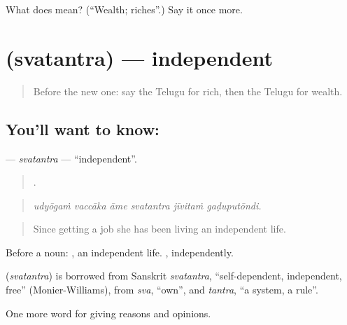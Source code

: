 \begin{tcolorbox}[breakable,colback=teal!4,colframe=teal!35!black,title={Before you move on}]
What does  mean? (\textquotedblleft{}Wealth; riches\textquotedblright{}.) Say it once more.
\end{tcolorbox}
\section[\texorpdfstring{\te{స్వతంత్ర} (svatantra)}{స్వతంత్ర (svatantra)}]{ (svatantra) — independent}

\label{lesson:TE-C404-svatantra}



\begin{quote}
Before the new one: say the Telugu for rich, then the Telugu for wealth.
\end{quote}

\subsection*{You'll want to know: }
\textbf{} — \emph{svatantra} — \textquotedblleft{}independent\textquotedblright{}.

\begin{quote}
     .
\end{quote}

\begin{quote}
\emph{udyōgaṁ vaccāka āme svatantra jīvitaṁ gaḍuputōndi.}
\end{quote}

\begin{quote}
Since getting a job she has been living an independent life.
\end{quote}

Before a noun:  , an independent life. , independently.

\begin{cousinweb}
\textbf{} (\emph{svatantra}) is borrowed from Sanskrit \emph{svatantra}, \textquotedblleft{}self-dependent, independent, free\textquotedblright{} (Monier-Williams), from \emph{sva}, \textquotedblleft{}own\textquotedblright{}, and \emph{tantra}, \textquotedblleft{}a system, a rule\textquotedblright{}.
\end{cousinweb}

\begin{grammarlens}[title={What you've built}]
One more word for giving reasons and opinions.
\end{grammarlens}

